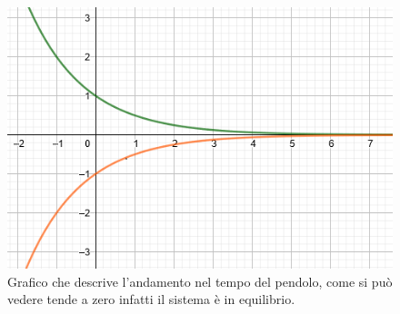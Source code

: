 \begin{nexample}
			\begin{figure}[H]
				\centering
				\includegraphics[scale=0.5]{immagini/esp3}
				\caption{ Grafico che descrive l'andamento nel tempo del pendolo, come si può vedere tende a zero infatti il sistema è in equilibrio. }
				\label{fig: esp3}
			\end{figure}
			
		\end{nexample}


